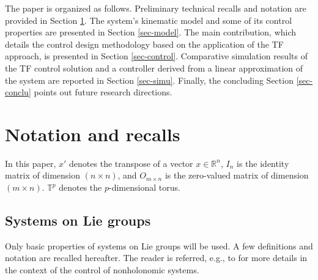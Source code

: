 \documentclass[a4paper,twoside]{article}
\def \RR {{\mathbb R}}
\def \TT {{\mathbb T}}
\begin{document}
The paper is organized as follows.  
Preliminary technical recalls and notation are provided in Section \ref{sec-rec}.
The system's kinematic model and some of its control properties are presented in Section \ref{sec-model}.  
The main contribution, which details the control design methodology based on the application of the TF 
approach, is presented in Section \ref{sec-control}. Comparative simulation results of the TF control solution and a controller derived from a linear approximation 
of the system are reported in Section \ref{sec-simu}. Finally, 
the concluding Section \ref{sec-conclu} points out future research directions.  

\section{Notation and recalls}
\label{sec-rec}


In this paper, $x'$ denotes the transpose of a vector $x \in \RR^n$, $I_n$ is the identity matrix of dimension $(n\times n)$, and $O_{m \times n}$ is the zero-valued 
matrix of dimension $(m \times n)$. 
$\TT^p$ denotes the $p$-dimensional torus. 

\subsection{Systems on Lie groups}
\label{rec-lie}
Only basic properties of systems on Lie groups will be used. A few definitions and notation are recalled hereafter. The reader is referred, e.g., to 
\cite{ms09-itro} for more details in the context of the control of nonholonomic systems.
\end{document}
